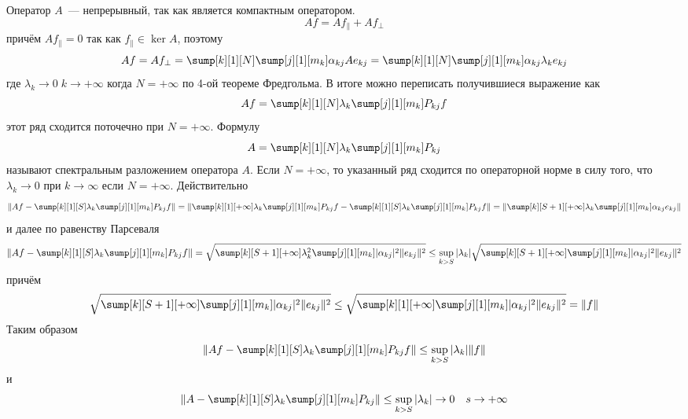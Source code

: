 \documentclass[14pt]{extarticle}
\begin{document}
Оператор $A$~--- непрерывный, так как является компактным оператором.
$$
Af = Af_\parallel + Af_\perp
$$
причём $Af_\parallel = 0$ так как $f_\parallel \in \ker A$, поэтому
$$
Af = Af_\perp = \sump[k][1][N] \sump[j][1][m_k] \alpha_{kj} Ae_{kj}
=  \sump[k][1][N] \sump[j][1][m_k] \alpha_{kj} \lambda_{k}e_{kj}
$$
где $\lambda_k \to 0\; k \to +\infty$ когда $N = +\infty$ по 4-ой теореме 
Фредгольма.
В итоге можно переписать получившиеся выражение как
$$
Af = \sump[k][1][N] \lambda_k\sump[j][1][m_k] P_{kj} f
$$
этот ряд сходится поточечно при $N = +\infty$.
Формулу
$$
A = \sump[k][1][N] \lambda_k\sump[j][1][m_k] P_{kj}
$$
называют спектральным разложением оператора $A$.
Если $N = +\infty$, то указанный ряд сходится по операторной норме в силу 
того, что $\lambda_k \to 0$ при $k \to \infty$ если $N = +\infty$.
Действительно
$$
\|Af - \sump[k][1][S] \lambda_k\sump[j][1][m_k] P_{kj} f\| =
\|\sump[k][1][+\infty] \lambda_k\sump[j][1][m_k] P_{kj} f -
\sump[k][1][S] \lambda_k\sump[j][1][m_k] P_{kj} f\| =
\|\sump[k][S + 1][+\infty] \lambda_k\sump[j][1][m_k] \alpha_{kj} e_{kj}\|
$$
и далее по равенству Парсеваля
$$
\|Af - \sump[k][1][S] \lambda_k\sump[j][1][m_k] P_{kj} f\| = 
\sqrt{\sump[k][S + 1][+\infty] \lambda_k^2 \sump[j][1][m_k] |\alpha_{kj}|^2\|e_{kj}\|
^2} \le \sup \limits_{k > S} |\lambda_k| \sqrt{\sump[k][S + 1][+\infty] \sump[j][1][m_k]
|\alpha_{kj}|^2\|e_{kj}\|^2}
$$
причём
$$
\sqrt{\sump[k][S + 1][+\infty] \sump[j][1][m_k]|\alpha_{kj}|^2\|e_{kj}\|^2} \le
\sqrt{\sump[k][1][+\infty] \sump[j][1][m_k] |\alpha_{kj}|^2\|e_{kj}\|^2} = \|f\|
$$
Таким образом
$$
\|Af - \sump[k][1][S] \lambda_k\sump[j][1][m_k] P_{kj} f\| \le \sup \limits_{k > S} |
\lambda_k| \|f\|
$$
и 
$$
\|A - \sump[k][1][S] \lambda_k\sump[j][1][m_k] P_{kj} \| \le \sup \limits_{k > S} |
\lambda_k| \to 0\quad s \to +\infty
$$
\end{document}
